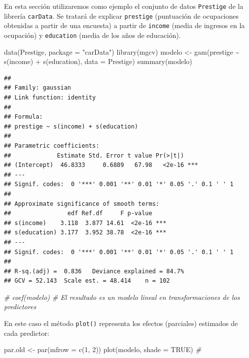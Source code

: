 \documentclass[
]{book}
\newenvironment{Shaded}{\begin{snugshade}}{\end{snugshade}}
\newcommand{\AttributeTok}[1]{\textcolor[rgb]{0.77,0.63,0.00}{#1}}
\newcommand{\CommentTok}[1]{\textcolor[rgb]{0.56,0.35,0.01}{\textit{#1}}}
\newcommand{\ConstantTok}[1]{\textcolor[rgb]{0.00,0.00,0.00}{#1}}
\newcommand{\DecValTok}[1]{\textcolor[rgb]{0.00,0.00,0.81}{#1}}
\newcommand{\FunctionTok}[1]{\textcolor[rgb]{0.00,0.00,0.00}{#1}}
\newcommand{\NormalTok}[1]{#1}
\newcommand{\OtherTok}[1]{\textcolor[rgb]{0.56,0.35,0.01}{#1}}
\newcommand{\SpecialCharTok}[1]{\textcolor[rgb]{0.00,0.00,0.00}{#1}}
\newcommand{\StringTok}[1]{\textcolor[rgb]{0.31,0.60,0.02}{#1}}
\theoremstyle{break}
\theoremstyle{definition}
\theoremstyle{definition}
\theoremstyle{definition}
\theoremstyle{definition}
\theoremstyle{remark}
\begin{document}
En esta sección utilizaremos como ejemplo el conjunto de datos \texttt{Prestige} de la librería \texttt{carData}.
Se tratará de explicar \texttt{prestige} (puntuación de ocupaciones obtenidas a partir de una encuesta) a partir de \texttt{income} (media de ingresos en la ocupación) y \texttt{education} (media de los años de educación).

\begin{Shaded}
\begin{Highlighting}[]
\FunctionTok{data}\NormalTok{(Prestige, }\AttributeTok{package =} \StringTok{"carData"}\NormalTok{)}
\FunctionTok{library}\NormalTok{(mgcv)}
\NormalTok{modelo }\OtherTok{\textless{}{-}} \FunctionTok{gam}\NormalTok{(prestige }\SpecialCharTok{\textasciitilde{}} \FunctionTok{s}\NormalTok{(income) }\SpecialCharTok{+} \FunctionTok{s}\NormalTok{(education), }\AttributeTok{data =}\NormalTok{ Prestige)}
\FunctionTok{summary}\NormalTok{(modelo)}
\end{Highlighting}
\end{Shaded}

\begin{verbatim}
## 
## Family: gaussian 
## Link function: identity 
## 
## Formula:
## prestige ~ s(income) + s(education)
## 
## Parametric coefficients:
##             Estimate Std. Error t value Pr(>|t|)    
## (Intercept)  46.8333     0.6889   67.98   <2e-16 ***
## ---
## Signif. codes:  0 '***' 0.001 '**' 0.01 '*' 0.05 '.' 0.1 ' ' 1
## 
## Approximate significance of smooth terms:
##                edf Ref.df     F p-value    
## s(income)    3.118  3.877 14.61  <2e-16 ***
## s(education) 3.177  3.952 38.78  <2e-16 ***
## ---
## Signif. codes:  0 '***' 0.001 '**' 0.01 '*' 0.05 '.' 0.1 ' ' 1
## 
## R-sq.(adj) =  0.836   Deviance explained = 84.7%
## GCV = 52.143  Scale est. = 48.414    n = 102
\end{verbatim}

\begin{Shaded}
\begin{Highlighting}[]
\CommentTok{\# coef(modelo) \# El resultado es un modelo lineal en transformaciones de los predictores}
\end{Highlighting}
\end{Shaded}

En este caso el método \texttt{plot()} representa los efectos (parciales) estimados de cada predictor:

\begin{Shaded}
\begin{Highlighting}[]
\NormalTok{par.old }\OtherTok{\textless{}{-}} \FunctionTok{par}\NormalTok{(}\AttributeTok{mfrow =} \FunctionTok{c}\NormalTok{(}\DecValTok{1}\NormalTok{, }\DecValTok{2}\NormalTok{))}
\FunctionTok{plot}\NormalTok{(modelo, }\AttributeTok{shade =} \ConstantTok{TRUE}\NormalTok{) }\CommentTok{\# }
\end{Highlighting}
\end{Shaded}
\end{document}
